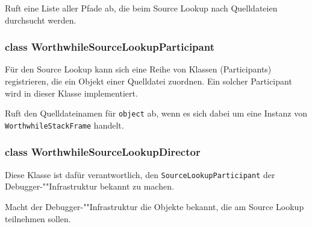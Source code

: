 \begin{description}
	Ruft eine Liste aller Pfade ab, die beim Source Lookup nach Quelldateien durchsucht werden.
\end{description}

\subsubsection{class WorthwhileSourceLookupParticipant}

Für den Source Lookup kann sich eine Reihe von Klassen (Participants) registrieren, die ein Objekt einer Quelldatei zuordnen. Ein solcher Participant wird in dieser Klasse implementiert.

\begin{description}
	 Ruft den Quelldateinamen für \texttt{object} ab, wenn es sich dabei um eine Instanz von \texttt{WorthwhileStackFrame} handelt.
\end{description}

\subsubsection{class WorthwhileSourceLookupDirector}

Diese Klasse ist dafür verantwortlich, den \texttt{SourceLookupParticipant} der Debugger-""Infrastruktur bekannt zu machen.

\begin{description}
	 Macht der Debugger-""Infrastruktur die Objekte bekannt, die am Source Lookup teilnehmen sollen.
\end{description}
